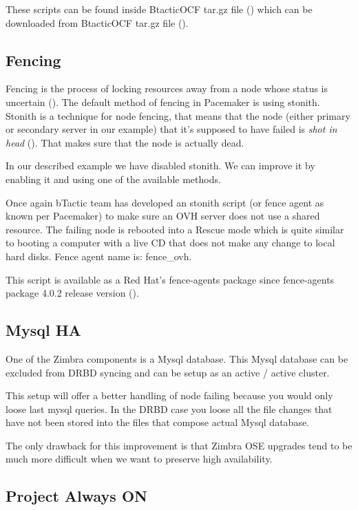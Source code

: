 These scripts can be found inside BtacticOCF tar.gz file (\cite{BtacticOCF}) which can be downloaded from BtacticOCF  tar.gz file (\cite{BtacticOrg}).

\subsection {\label{subsec:fencing}Fencing}
Fencing is the process of locking resources away from a node whose status is uncertain (\cite{LinuxHAFencing}). The default method of fencing in Pacemaker is using stonith. Stonith is a technique for node fencing, that means that the node (either primary or secondary server in our example) that it's supposed to have failed is \textit{shot in head} (\cite{LinuxHAStonith}). That makes sure that the node is actually dead.

In our described example we have disabled stonith. We can improve it by enabling it and using one of the available methods.

Once again bTactic team has developed an stonith script (or fence agent as known per Pacemaker) to make sure an OVH server does not use a shared resource. The failing node is rebooted into a Rescue mode which is quite similar to booting a computer with a live CD that does not make any change to local hard disks. Fence agent name is: fence\_ovh.

This script is available as a Red Hat's fence-agents package since fence-agents package 4.0.2 release version (\cite{LinuxClusterML201307}).

\subsection {\label{subsection:mysql-ha}Mysql HA}
One of the Zimbra components is a Mysql database. This Mysql database can be excluded from DRBD syncing and can be setup as an active / active cluster.

This setup will offer a better handling of node failing because you would only loose last mysql queries. In the DRBD case you loose all the file changes that have not been stored into the files that compose actual Mysql database.

The only drawback for this improvement is that Zimbra OSE upgrades tend to be much more difficult when we want to preserve high availability.

\subsection {Project Always ON}

